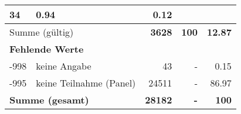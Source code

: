 \begin{longtable}{lXrrr}
       \num{34} &
       \num[round-mode=places,round-precision=2]{0.94} &
         \num[round-mode=places,round-precision=2]{0.12} \\
     \midrule
     \multicolumn{2}{l}{Summe (gültig)} &
       \textbf{\num{3628}} &
     \textbf{\num{100}} &
       \textbf{\num[round-mode=places,round-precision=2]{12.87}} \\
     \multicolumn{5}{l}{\textbf{Fehlende Werte}}\\
       -998 &
       keine Angabe &
         \num{43} &
        - &
         \num[round-mode=places,round-precision=2]{0.15} \\
       -995 &
       keine Teilnahme (Panel) &
         \num{24511} &
        - &
         \num[round-mode=places,round-precision=2]{86.97} \\
     \midrule
     \multicolumn{2}{l}{\textbf{Summe (gesamt)}} &
          \textbf{\num{28182}} &
        \textbf{-} &
        \textbf{\num{100}} \\
     \bottomrule
     \end{longtable}
     
